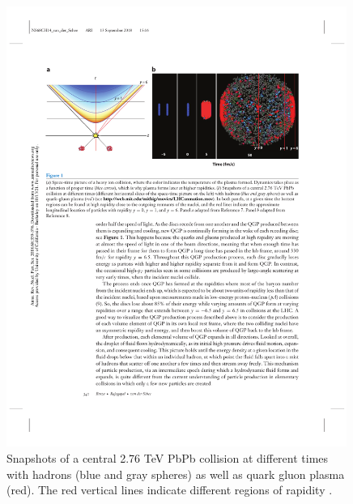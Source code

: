 \begin{figure}[htpb]
  \centering
  \includegraphics[width=0.99\textwidth]{Introduction/collision_snapshot.pdf}
  \caption{Snapshots of a central 2.76 TeV PbPb collision at different times with hadrons (blue and gray spheres) as well as quark gluon plasma (red). The red vertical lines indicate different regions of rapidity \cite{annurev-nucl}.}
  \label{fig:collision_snapshot}
\end{figure}
